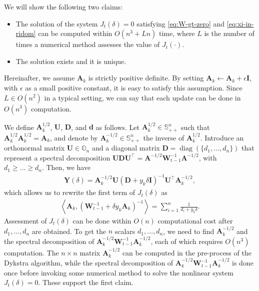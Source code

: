 \documentclass[10pt,onecolumn]{article}
\theoremstyle{definition}
\theoremstyle{definition}
\theoremstyle{definition}
\theoremstyle{definition}
\theoremstyle{definition}
\theoremstyle{theorem}
\newcommand{\0}{{\bm{0}}}
\newcommand{\1}{{\bm{1}}}
\newcommand{\vd}{{\bm{d}}}
\newcommand{\vA}{{\bm{A}}}
\newcommand{\vD}{{\bm{D}}}
\newcommand{\vI}{{\bm{I}}}
\newcommand{\bO}{{\mathbb{O}}}
\newcommand{\bS}{{\mathbb{S}}}
\newcommand{\vU}{{\bm{U}}}
\newcommand{\vW}{{\bm{W}}}
\newcommand{\Y}{{\bm{Y}}}
\DeclareMathOperator{\diag}{diag}
\begin{document}
We will show the following two claims:
%
\begin{itemize}
\item The solution of the
system $J_{t}(\delta)=0$ satisfying \eqref{eq:W-gt-zero}
and \eqref{eq:xi-in-ridom} can be
computed within $O(n^{3}+Ln)$ time, where $L$ is
the number of times a numerical method assesses the value of
$J_{t}(\cdot)$.
\\
\item The solution exists and it is unique.
\end{itemize}
%
Hereinafter, we assume $\vA_{k}$ is strictly positive definite.
By setting
$\vA_{k} \leftarrow \vA_{k} + \epsilon \vI$, with $\epsilon$ as a small positive
constant, it is easy to satisfy this assumption.
Since $L \in O(n^{2})$ in a typical setting, we can say that
each update can be done in $O(n^{3})$ computation. 

We define $\vA^{1/2}_{k}$, $\vU$, $\vD$, and $\vd$ as follows. 
Let $\vA_{k}^{1/2}\in\bS_{++}^{n}$ 
such that $\vA_{k}^{1/2}\vA_{k}^{1/2}=\vA_{k}$, and 
denote by $\vA_{k}^{-1/2}\in\bS_{++}^{n}$ the inverse of $\vA_{k}^{1/2}$.
Introduce an orthonormal matrix $\vU\in\bO_{n}$ and 
a diagonal matrix $\vD=\diag(\{d_{1},\dots,d_{n}\})$ that 
represent a spectral decomposition 
$\vU\vD\vU^{\top} = \vA^{-1/2}\vW_{t-1}^{-1}\vA^{-1/2}$,
with $d_{1}\ge\dots\ge d_{n}$. 
Then, we have
%
\begin{align}\label{eq:Y-diagnolized}
\Y(\delta) = 
\vA_{k}^{-1/2} \vU
(\vD + y_{k} \delta \vI)^{-1} \vU^{\top} \vA_{k}^{-1/2},
\end{align}
%
which allows us to rewrite the first term of $J_{t}(\delta)$ as 
%
\begin{align}\label{eq:dotprod-linear-comp}
\left<\vA_k,
(\vW_{t-1}^{-1} + \delta y_{k} \vA_k)^{-1}
\right> 
=
\sum_{i=1}^{n}\frac{1}{d_{i}+y_{k}\delta}. 
\end{align}
%
Assessment of $J_{t}(\delta)$ can be
done within $O(n)$ computational cost after $d_{1},\dots,d_{n}$ are obtained.
To get the $n$ scalars $d_{1},\dots,d_{n}$,
we need to find $\vA_k^{-1/2}$ and the
spectral decomposition of $\vA^{-1/2}_k\vW_{t-1}^{-1}\vA^{-1/2}_k$, 
each of which requires $O(n^{3})$ computation. 
The $n\times n$ matrix $\vA^{-1/2}_{k}$ can be computed
in the pre-process of the Dykstra algorithm, while 
the spectral decomposition of $\vA^{-1/2}_k\vW_{t-1}^{-1}\vA^{-1/2}_k$
is done once before invoking some numerical method to
solve the nonlinear system $J_{t}(\delta)=0$. These support the first claim.
\end{document}
